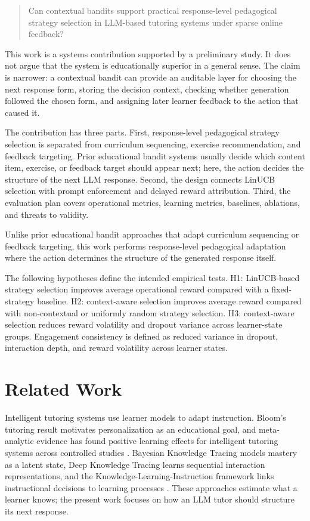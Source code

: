 \documentclass[conference]{IEEEtran}
\begin{document}
\begin{quote}
Can contextual bandits support practical response-level pedagogical strategy selection in LLM-based tutoring systems under sparse online feedback?
\end{quote}

This work is a systems contribution supported by a preliminary study. It does not argue that the system is educationally superior in a general sense. The claim is narrower: a contextual bandit can provide an auditable layer for choosing the next response form, storing the decision context, checking whether generation followed the chosen form, and assigning later learner feedback to the action that caused it.

The contribution has three parts. First, response-level pedagogical strategy selection is separated from curriculum sequencing, exercise recommendation, and feedback targeting. Prior educational bandit systems usually decide which content item, exercise, or feedback target should appear next; here, the action decides the structure of the next LLM response. Second, the design connects LinUCB selection with prompt enforcement and delayed reward attribution. Third, the evaluation plan covers operational metrics, learning metrics, baselines, ablations, and threats to validity.

Unlike prior educational bandit approaches that adapt curriculum sequencing or feedback targeting, this work performs response-level pedagogical adaptation where the action determines the structure of the generated response itself.

The following hypotheses define the intended empirical tests. H1: LinUCB-based strategy selection improves average operational reward compared with a fixed-strategy baseline. H2: context-aware selection improves average reward compared with non-contextual or uniformly random strategy selection. H3: context-aware selection reduces reward volatility and dropout variance across learner-state groups. Engagement consistency is defined as reduced variance in dropout, interaction depth, and reward volatility across learner states.

\section{Related Work}

Intelligent tutoring systems use learner models to adapt instruction. Bloom's tutoring result motivates personalization as an educational goal, and meta-analytic evidence has found positive learning effects for intelligent tutoring systems across controlled studies . Bayesian Knowledge Tracing models mastery as a latent state, Deep Knowledge Tracing learns sequential interaction representations, and the Knowledge-Learning-Instruction framework links instructional decisions to learning processes . These approaches estimate what a learner knows; the present work focuses on how an LLM tutor should structure its next response.
\end{document}
